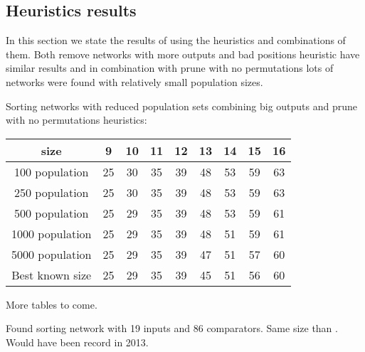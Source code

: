 \documentclass[../main.tex]{subfiles}
\begin{document}
	\subsection{Heuristics results}
	In this section we state the results of using the heuristics and combinations of them. Both remove networks with more outputs and bad positions heuristic have similar results and in combination with prune with no permutations lots of networks were found with relatively small population sizes.
	
	Sorting networks with reduced population sets combining big outputs and prune with no permutations heuristics:
	\begin{center}
		\begin{tabular}{|c | c c c c c c c c|} 
			\hline
			size & 9 & 10 & 11 & 12 & 13 & 14 & 15 & 16  \\ [0.5ex] 
			\hline\hline
			100 population & 25 & 30 & 35 & 39 & 48 & 53 & 59 & 63 \\ [1ex]
			\hline
			250 population  & 25 & 30 & 35 & 39 & 48 & 53 & 59 & 63 \\  [1ex] 
			\hline
			500 population & 25 & 29 & 35 & 39 & 48 & 53 & 59 & 61 \\  [1ex] 
			\hline
			1000 population & 25 & 29 & 35 & 39 & 48 & 51 & 59 & 61 \\  [1ex] 
			\hline
			5000 population & 25 & 29 & 35 & 39 & 47 & 51 & 57 & 60 \\  [1ex] 
			\hline
			Best known size & 25 & 29 & 35 & 39 & 45 & 51 & 56 & 60 \\  [1ex] 
			\hline
		\end{tabular}
	\end{center}
	
	More tables to come.
	
	Found sorting network with 19 inputs and 86 comparators. Same size than \cite{valsalam:jmlr13}. Would have been record in 2013. 
\end{document}
